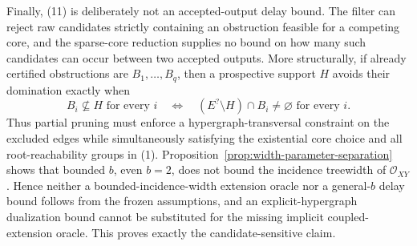 Finally, (11) is deliberately not an accepted-output delay bound.  The filter can reject raw candidates strictly containing an obstruction feasible for a competing core, and the sparse-core reduction supplies no bound on how many such candidates can occur between two accepted outputs.  More structurally, if already certified obstructions are \(B_1,\ldots,B_q\), then a prospective support \(H\) avoids their domination exactly when
\[
 B_i\nsubseteq H\text{ for every }i
 \quad\Longleftrightarrow\quad
 (E^{?}\setminus H)\cap B_i\ne\varnothing\text{ for every }i.
\tag{12}
\]
Thus partial pruning must enforce a hypergraph-transversal constraint on the excluded edges while simultaneously satisfying the existential core choice and all root-reachability groups in (1).  Proposition~\ref{prop:width-parameter-separation} shows that bounded \(b\), even \(b=2\), does not bound the incidence treewidth of \(\mathcal O_{XY}\).  Hence neither a bounded-incidence-width extension oracle nor a general-\(b\) delay bound follows from the frozen assumptions, and an explicit-hypergraph dualization bound cannot be substituted for the missing implicit coupled-extension oracle.  This proves exactly the candidate-sensitive claim.
